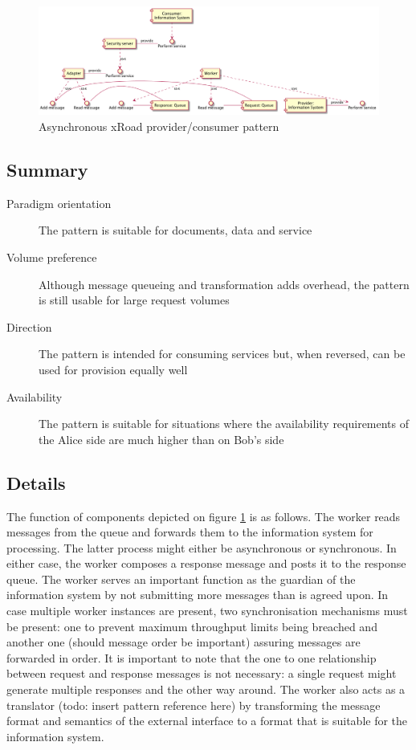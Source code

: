 \documentclass[10pt,a4paper]{article}
\begin{document}
\begin{figure}[htp]
	\begin{center}
		\includegraphics[width=1\textwidth]{gfx/5_comp.png}
		\caption{Asynchronous xRoad provider/consumer pattern}
		\label{fig:p:5}
	\end{center}
\end{figure}

\subsection{Summary}
\begin{description}
	\item[Paradigm orientation] The pattern is suitable for documents, data and service
	\item[Volume preference] Although message queueing and transformation adds overhead, the pattern is still usable for large request volumes
	\item[Direction] The pattern is intended for consuming services but, when reversed, can be used for provision equally well
	\item[Availability] The pattern is suitable for situations where the availability requirements of the Alice side are much higher than on Bob's side
\end{description}

\subsection{Details}
The function of components depicted on figure \ref{fig:p:5} is as follows.
The worker reads messages from the queue and forwards them to the information system for processing. The latter process might either be asynchronous or synchronous. In either case, the worker composes a response message and posts it to the response queue. The worker serves an important function as the guardian of the information system by not submitting more messages than is agreed upon. In case multiple worker instances are present, two synchronisation mechanisms must be present: one to prevent maximum throughput limits being breached and another one (should message order be important) assuring messages are forwarded in order. It is important to note that the one to one relationship between request and response messages is not necessary: a single request might generate multiple responses and the other way around. The worker also acts as a translator (todo: insert pattern reference here) by transforming the message format and semantics of the external interface to a format that is suitable for the information system. 
\end{document}
